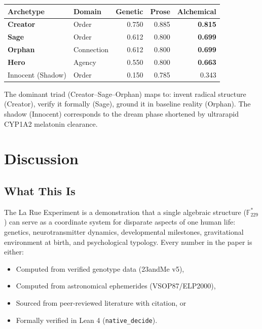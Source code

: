 \documentclass[12pt, letterpaper]{article}
\begin{document}
\begin{center}
\begin{tabular}{llrrr}
\toprule
\textbf{Archetype} & \textbf{Domain} & \textbf{Genetic} & \textbf{Prose} & \textbf{Alchemical} \\
\midrule
\textbf{Creator} & Order & 0.750 & 0.885 & \textbf{0.815} \\
\textbf{Sage} & Order & 0.612 & 0.800 & \textbf{0.699} \\
\textbf{Orphan} & Connection & 0.612 & 0.800 & \textbf{0.699} \\
\textbf{Hero} & Agency & 0.550 & 0.800 & \textbf{0.663} \\
\midrule
Innocent (Shadow) & Order & 0.150 & 0.785 & 0.343 \\
\bottomrule
\end{tabular}
\end{center}

The dominant triad (Creator--Sage--Orphan) maps to: invent radical structure (Creator), verify it formally (Sage), ground it in baseline reality (Orphan). The shadow (Innocent) corresponds to the dream phase shortened by ultrarapid CYP1A2 melatonin clearance.

\section{Discussion}

\subsection{What This Is}

The La Rue Experiment is a demonstration that a single algebraic structure ($\mathbb{F}^*_{229}$) can serve as a coordinate system for disparate aspects of one human life: genetics, neurotransmitter dynamics, developmental milestones, gravitational environment at birth, and psychological typology. Every number in the paper is either:
\begin{itemize}[nosep]
    \item Computed from verified genotype data (23andMe v5),
    \item Computed from astronomical ephemerides (VSOP87/ELP2000),
    \item Sourced from peer-reviewed literature with citation, or
    \item Formally verified in Lean 4 (\texttt{native\_decide}).
\end{itemize}
\end{document}
